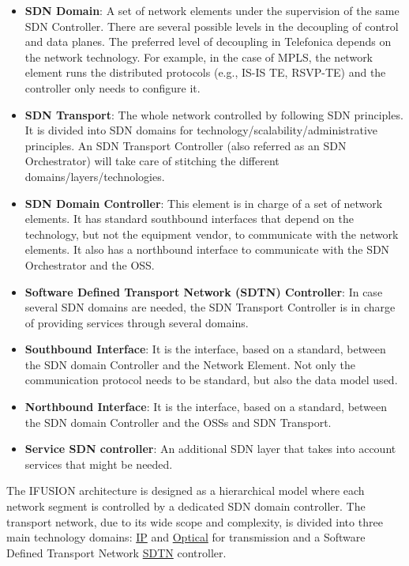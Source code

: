 \documentclass[a4paper,fleqn]{cas-dc}
\begin{document}
\begin{itemize}
\item \textbf{SDN Domain}: A set of network elements under the supervision of the same SDN Controller. There are several possible levels in the decoupling of control and data planes. The preferred level of decoupling in Telefonica depends on the network technology. For example, in the case of MPLS, the network element runs the distributed protocols (e.g., IS-IS TE, RSVP-TE) and the controller only needs to configure it.

\item \textbf{SDN Transport}: The whole network controlled by following SDN principles. It is divided into SDN domains for technology/scalability/administrative principles. An SDN Transport Controller (also referred as an SDN Orchestrator) will take care of stitching the different domains/layers/technologies.

\item \textbf{SDN Domain Controller}: This element is in charge of a set of network elements. It has standard southbound interfaces that depend on the technology, but not the equipment vendor, to communicate with the network elements. It also has a northbound interface to communicate with the SDN Orchestrator and the OSS.

\item \textbf{Software Defined Transport Network (SDTN) Controller}: In case several SDN domains are needed, the SDN Transport Controller is in charge of providing services through several domains. 

\item \textbf{Southbound Interface}: It is the interface, based on a standard, between the SDN domain Controller and the Network Element. Not only the communication protocol needs to be standard, but also the data model used.

\item \textbf{Northbound Interface}: It is the interface, based on a standard, between the SDN domain Controller and the OSSs and SDN Transport.

\item \textbf{Service SDN controller}: An additional SDN layer that takes into account services that might be needed. 
\end{itemize}

The \uppercase{iFUSION} architecture is designed as a hierarchical model where each network segment is controlled by a dedicated SDN domain controller. The transport network, due to its wide scope and complexity, is divided into three main technology domains: \hyperref[section:ip]{IP} and \hyperref[section:dwdm]{Optical} for transmission and a Software Defined Transport Network \hyperref[section:sdtn]{SDTN} controller.
\end{document}
